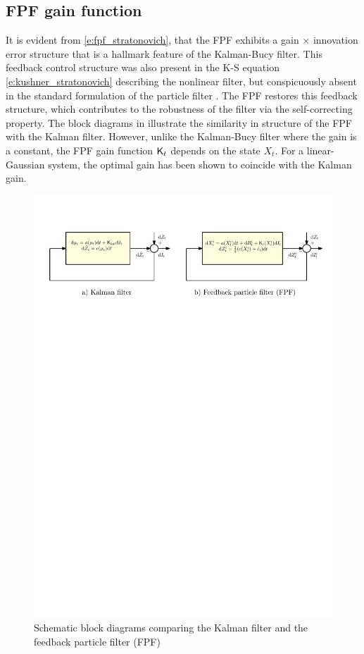 \subsection{FPF gain function}
\label{s:fpf_gain}
It is evident from \eqref{e:fpf_stratonovich}, that the FPF exhibits a gain $\times$ innovation error structure that is a hallmark feature of the Kalman-Bucy filter. This feedback control structure was also present in the K-S equation \eqref{e:kushner_stratonovich} describing the nonlinear filter, but conspicuously absent in the standard formulation of the particle filter . The FPF restores this feedback structure, which contributes to the robustness of the filter via the self-correcting property.  The block diagrams in  illustrate the similarity in structure of the FPF with the Kalman filter. However, unlike the Kalman-Bucy filter where the gain is a constant, the FPF gain function $\text{\sf K}_t$ depends on the state $X_t$. For a linear-Gaussian system, the optimal gain has been shown to coincide with the Kalman gain. 
\begin{figure}[h]
	\begin{center}
		\includegraphics[width = 7in]{images/Chap4_FPF_Kalman}
		\caption{Schematic block diagrams comparing the Kalman filter and the feedback particle filter (FPF) \cite{yanmehmey13}}
		\label{fig:fpf_kalman}
	\end{center}
\end{figure}

